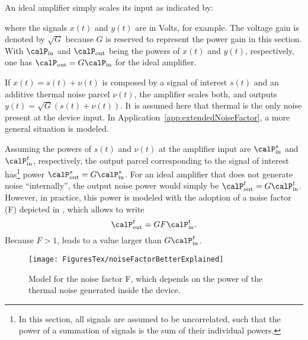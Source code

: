 An ideal amplifier simply scales its input as indicated by:

where the signals $x(t)$ and $y(t)$ are in Volts, for example. The voltage gain is denoted by $\sqrt{G}$ because $G$ is reserved to represent the power gain in this section. With $\calP_{\textrm{in}}$ and $\calP_{\textrm{out}}$ being the powers of $x(t)$ and $y(t)$, respectively, one has $\calP_{\textrm{out}} = G \calP_{\textrm{in}}$ for the ideal amplifier.

If $x(t)=s(t)+\nu(t)$ is composed by a signal of interest $s(t)$ and an additive thermal noise parcel $\nu(t)$, the amplifier scales both, and outputs $y(t)=\sqrt{G}(s(t)+\nu(t))$. 
It is assumed here that thermal is the only noise present at the device input. In Application~\ref{app:extendedNoiseFactor}, a more general situation is modeled.

Assuming the powers of $s(t)$ and $\nu(t)$ at the amplifier input are $\calP_{\textrm{in}}^{s}$ and $\calP_{\textrm{in}}^{t}$, respectively, 
the output parcel corresponding to the signal of interest has\footnote{In this section, all signals are assumed to be uncorrelated, such that the power of a summation of signals is the sum of their individual powers.} power $\calP_{\textrm{out}}^{s} = G \calP_{\textrm{in}}^{s}$.
For an ideal amplifier that does not generate noise ``internally'', the output noise power would simply be $\calP_{\textrm{out}}^{t} = G \calP_{\textrm{in}}^{t}$.
However, in practice, this power is modeled with the adoption of a
noise factor (F) depicted in , which allows to write
\begin{equation}
\calP_{\textrm{out}}^{t} = G F \calP_{\textrm{in}}^{t}.
\label{eq:simplifiedExpressionForNoiseOutput}
\end{equation}
Because $F>1$,  leads to a value larger than
$G \calP_{\textrm{in}}^{t}$.

\begin{figure}[htbp]
  \begin{center}
    \texttt{[image: FiguresTex/noiseFactorBetterExplained]}
  \end{center}
  \caption{Model for the noise factor F, which depends on the power of the thermal noise generated inside the device.\label{fig:noiseFactorBetterExplained}}  
\end{figure}

